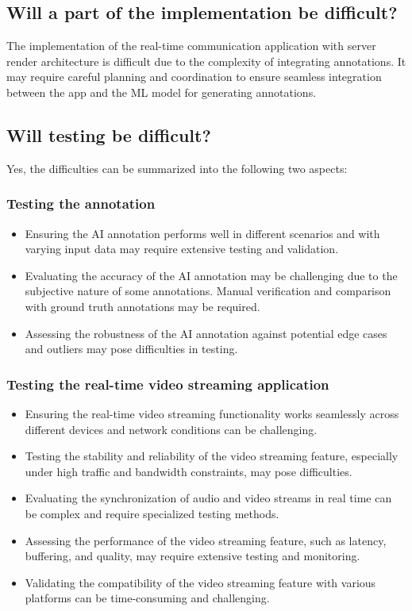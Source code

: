 \documentclass{article}
\begin{document}
\subsection{Will a part of the implementation be difficult?}

The implementation of the real-time communication application with server render
architecture is difficult due to the complexity of integrating annotations. It
may require careful planning and coordination to ensure seamless integration
between the app and the ML model for generating annotations.

\subsection{Will testing be difficult?}

Yes, the difficulties can be summarized into the following two aspects:

\subsubsection{Testing the annotation}

\begin{itemize}
\item Ensuring the AI annotation performs well in different scenarios and with
  varying input data may require extensive testing and validation.
\item Evaluating the accuracy of the AI annotation may be challenging due to the
  subjective nature of some annotations. Manual verification and comparison with
  ground truth annotations may be required.
\item Assessing the robustness of the AI annotation against potential edge cases
  and outliers may pose difficulties in testing.
\end{itemize}

\subsubsection{Testing the real-time video streaming application}

\begin{itemize}
\item Ensuring the real-time video streaming functionality works seamlessly across
  different devices and network conditions can be challenging.
\item Testing the stability and reliability of the video streaming feature,
  especially under high traffic and bandwidth constraints, may pose
  difficulties.
\item Evaluating the synchronization of audio and video streams in real time can be
  complex and require specialized testing methods.
\item Assessing the performance of the video streaming feature, such as latency,
  buffering, and quality, may require extensive testing and monitoring.
\item Validating the compatibility of the video streaming feature with various
  platforms can be time-consuming and challenging.
\end{itemize}
\end{document}
